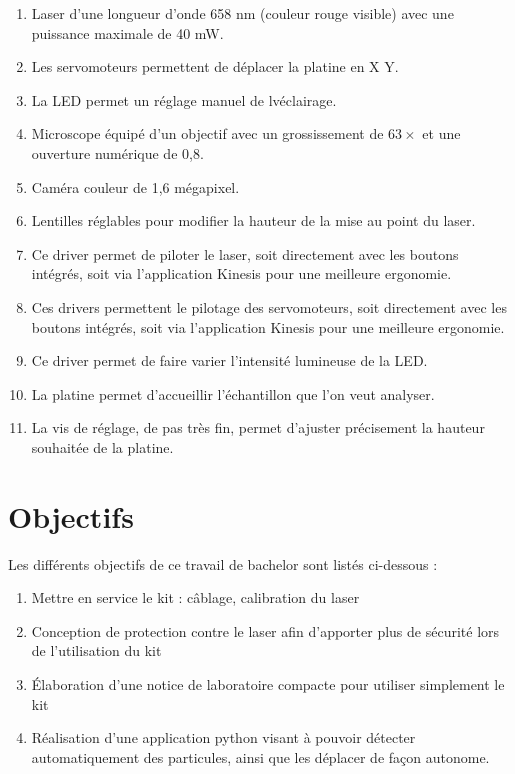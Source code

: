 \begin{enumerate}
    \item Laser d'une longueur d'onde 658 nm (couleur rouge visible) avec une puissance maximale de 40 mW.
    \item Les servomoteurs permettent de déplacer la platine en X Y.
    \item La LED permet un réglage manuel de lvéclairage.
    \item Microscope équipé d'un objectif avec un grossissement de $63\times$ et une ouverture numérique de 0,8.
    \item Caméra couleur de 1,6 mégapixel.
    \item Lentilles réglables pour modifier la hauteur de la mise au point du laser.
    \item Ce driver permet de piloter le laser, soit directement avec les boutons intégrés, soit via l'application Kinesis pour une meilleure ergonomie.
    \item Ces drivers permettent le pilotage des servomoteurs, soit directement avec les boutons intégrés, soit via l'application Kinesis pour une meilleure ergonomie.
    \item Ce driver permet de faire varier l'intensité lumineuse de la LED.
    \item La platine permet d'accueillir l'échantillon que l'on veut analyser.
    \item La vis de réglage, de pas très fin, permet d'ajuster précisement la hauteur souhaitée de la platine.
\end{enumerate}

\section{Objectifs}

Les différents objectifs de ce travail de bachelor sont listés ci-dessous :
\begin{enumerate}
    \item Mettre en service le kit : câblage, calibration du laser
    \item Conception de protection contre le laser afin d'apporter plus de sécurité lors de l'utilisation du kit
    \item Élaboration d'une notice de laboratoire compacte pour utiliser simplement le kit
    \item Réalisation d'une application python visant à pouvoir détecter automatiquement des particules, ainsi que les déplacer de façon autonome.
\end{enumerate}

